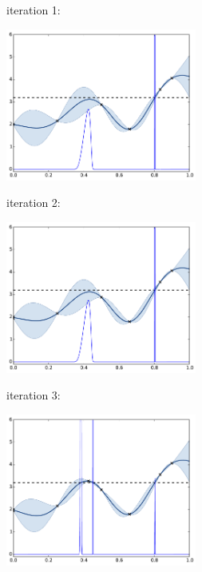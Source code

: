 \begin{frame}[noframenumbering]{}
iteration 1:
\begin{center}
\includegraphics[height=5cm]{4_optimization/figures/python/invproba1}
\end{center}
\end{frame}

\begin{frame}[noframenumbering]{}
iteration 2:
\begin{center}
\includegraphics[height=5cm]{4_optimization/figures/python/invproba2}
\end{center}
\end{frame}

\begin{frame}[noframenumbering]{}
iteration 3:
\begin{center}
\includegraphics[height=5cm]{4_optimization/figures/python/invproba3}
\end{center}
\end{frame}

